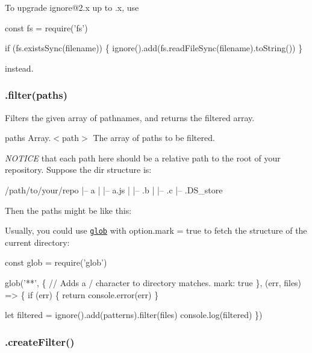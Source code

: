 To upgrade {\ttfamily ignore@2.\+x} up to {.\+x}, use


\begin{DoxyCode}
const fs = require('fs')

if (fs.existsSync(filename)) \{
  ignore().add(fs.readFileSync(filename).toString())
\}
\end{DoxyCode}


instead.

\subsubsection*{.filter(paths)}

Filters the given array of pathnames, and returns the filtered array.


\begin{DoxyItemize}
\item paths {\ttfamily Array.$<$path$>$} The array of paths to be filtered.
\end{DoxyItemize}

{\itshape N\+O\+T\+I\+CE} that each {\ttfamily path} here should be a relative path to the root of your repository. Suppose the dir structure is\+:


\begin{DoxyCode}
/path/to/your/repo
    |-- a
    |   |-- a.js
    |
    |-- .b
    |
    |-- .c
         |-- .DS\_store
\end{DoxyCode}


Then the {\ttfamily paths} might be like this\+:


\begin{DoxyCode}
[
  'a/a.js'
  '.b',
  '.c/.DS\_store'
]
\end{DoxyCode}


Usually, you could use \href{http://npmjs.org/package/glob}{\tt {\ttfamily glob}} with {\ttfamily option.\+mark = true} to fetch the structure of the current directory\+:


\begin{DoxyCode}
const glob = require('glob')

glob('**', \{
  // Adds a / character to directory matches.
  mark: true
\}, (err, files) => \{
  if (err) \{
    return console.error(err)
  \}

  let filtered = ignore().add(patterns).filter(files)
  console.log(filtered)
\})
\end{DoxyCode}


\subsubsection*{.create\+Filter()}

